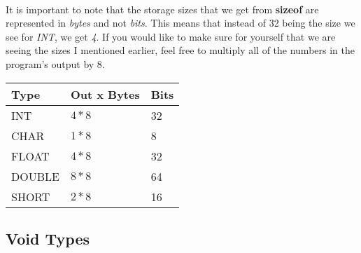 \paragraph{}
   It is important to note that the storage sizes that we get from \textbf{sizeof} are represented in \textit{bytes} and not \textit{bits}.
   This means that instead of 32 being the size we see for \textit{INT}, we get \textit{4}. If you would like to make sure for yourself that we are
   seeing the sizes I mentioned earlier, feel free to multiply all of the numbers in the program's output by 8.

\begin{center}
   \begin{tabular}{ || p{1in} | p{2in} | p{2in} || }
   \hline
   \textbf{Type} & \textbf{Out x Bytes} & \textbf{Bits} \\ [0.75ex]
   \hline\hline
   INT & \(4 * 8\) & 32 \\
   \hline
   CHAR & \(1 * 8\) & 8 \\
   \hline
   FLOAT & \(4 * 8\) & 32 \\
   \hline
   DOUBLE & \(8 * 8\) & 64 \\
   \hline
   SHORT & \(2 * 8\) & 16 \\
   \hline
   \end{tabular}
\end{center}

\newpage

\subsection{Void Types}
